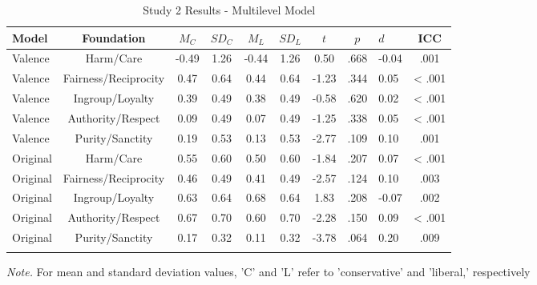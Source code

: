 \documentclass[
  man,floatsintext]{apa6}
\begin{document}
\begin{table}[h]

\begin{center}
\begin{threeparttable}

\caption{\label{tab:exp1-table}Study 2 Results - Multilevel Model}

\footnotesize{

\begin{tabular}{lccccccclc}
\toprule
Model & Foundation & $M_C$ & $SD_C$ & $M_L$ & $SD_L$ & $t$ & $p$ & $d$ & ICC\\
\midrule
Valence & Harm/Care & -0.49 & 1.26 & -0.44 & 1.26 & 0.50 & .668 & -0.04 & .001\\
Valence & Fairness/Reciprocity & 0.47 & 0.64 & 0.44 & 0.64 & -1.23 & .344 & 0.05 & < .001\\
Valence & Ingroup/Loyalty & 0.39 & 0.49 & 0.38 & 0.49 & -0.58 & .620 & 0.02 & < .001\\
Valence & Authority/Respect & 0.09 & 0.49 & 0.07 & 0.49 & -1.25 & .338 & 0.05 & < .001\\
Valence & Purity/Sanctity & 0.19 & 0.53 & 0.13 & 0.53 & -2.77 & .109 & 0.10 & .001\\
Original & Harm/Care & 0.55 & 0.60 & 0.50 & 0.60 & -1.84 & .207 & 0.07 & < .001\\
Original & Fairness/Reciprocity & 0.46 & 0.49 & 0.41 & 0.49 & -2.57 & .124 & 0.10 & .003\\
Original & Ingroup/Loyalty & 0.63 & 0.64 & 0.68 & 0.64 & 1.83 & .208 & -0.07 & .002\\
Original & Authority/Respect & 0.67 & 0.70 & 0.60 & 0.70 & -2.28 & .150 & 0.09 & < .001\\
Original & Purity/Sanctity & 0.17 & 0.32 & 0.11 & 0.32 & -3.78 & .064 & 0.20 & .009\\
\bottomrule
\addlinespace
\end{tabular}

}

\begin{tablenotes}[para]
\normalsize{\textit{Note.} For mean and standard deviation values, 'C' and 'L' refer to 'conservative' and 'liberal,' respectively}
\end{tablenotes}

\end{threeparttable}
\end{center}

\end{table}
\end{document}
